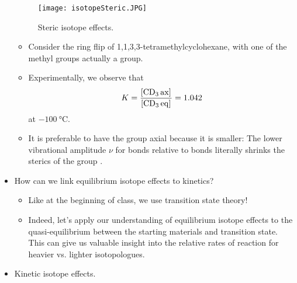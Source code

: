 \documentclass[../notes.tex]{subfiles}
\begin{document}
\begin{itemize}
\begin{figure}[H]
        \centering
        \texttt{[image: isotopeSteric.JPG]}
        \caption{Steric isotope effects.}
        \label{fig:isotopeSteric}
    \end{figure}
    \begin{itemize}
        \item Consider the ring flip of 1,1,3,3-tetramethylcyclohexane, with one of the methyl groups actually a  group.
        \item Experimentally, we observe that
        \begin{equation*}
            K = \frac{\cnc{CD3 ax}}{\cnc{CD3 eq}} = 1.042
        \end{equation*}
        at $-\SI{100}{\celsius}$.
        \item It is preferable to have the  group axial because it is smaller: The lower vibrational amplitude $\nu$ for  bonds relative to  bonds literally shrinks the sterics of the group \parencite[430,434]{bib:Anslyn}.
    \end{itemize}
    \item How can we link equilibrium isotope effects to kinetics?
    \begin{itemize}
        \item Like at the beginning of class, we use transition state theory!
        \item Indeed, let's apply our understanding of equilibrium isotope effects to the quasi-equilibrium between the starting materials and transition state. This can give us valuable insight into the relative rates of reaction for heavier vs. lighter isotopologues.
    \end{itemize}
    \item Kinetic isotope effects.
    \begin{figure}[h!]
        \centering
\end{figure}
\end{itemize}
\end{document}
